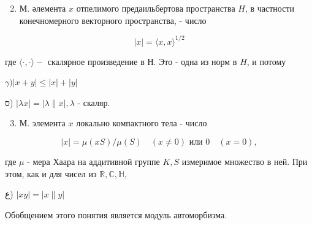 \documentclass[10pt]{article}
\begin{document}
\begin{enumerate}

  \setcounter{enumi}{1}

  \item М. әлемента $x$ отпелимого предаильбертова пространства $H$, в частности конечномерного векторного пространства, - число

\end{enumerate}



\[

|x|=\langle x, x\rangle^{1 / 2}

\]



где $\langle\cdot, \cdot\rangle-$ скалярное произведение в $Н$. Это - одна из норм в $H$, и потому



$\gamma)|x+y| \leqslant|x|+|y|$



ס) $|\lambda x|=|\lambda \| x|, \lambda$ - скаляр.



\begin{enumerate}

  \setcounter{enumi}{2}

  \item М. элемента $x$ локально компактного тела - число

\end{enumerate}



\[

|x|=\mu(x S) / \mu(S) \quad(x \neq 0) \text { или } 0 \quad(x=0),

\]



где $\mu$ - мера Хаара на аддитивной группе $K, S$ измеримое множество в ней. При этом, как и для чисел из $\mathbb{R}, \mathbb{C}, \mathbb{H}$,



ع) $|x y|=|x \| y|$



Обобщением этого понятия является модуль автоморбизма.
\end{document}
